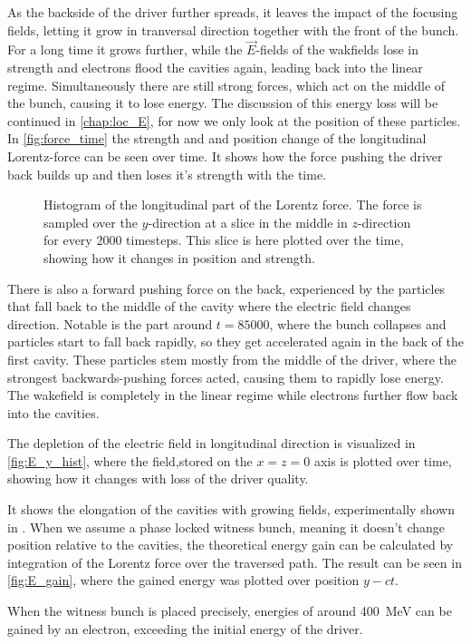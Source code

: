 \documentclass[bachelor_thesis]{subfiles}
\begin{document}
As the backside of the driver further spreads, it leaves the impact of the focusing fields, letting it grow in tranversal direction together with the front of the bunch. For a long time it grows further, while the $\vec{E}$-fields of the wakfields lose in strength and electrons flood the cavities again, leading back into the linear regime.
Simultaneously there are still strong forces, which act on the middle of the bunch, causing it to lose energy. The discussion of this energy loss will be continued in \autoref{chap:loc_E}, for now we only look at the position of these particles.
In \autoref{fig:force_time} the strength and and position change of the longitudinal Lorentz-force can be seen over time. It shows how the force pushing the driver back builds up and then loses it's strength with the time.
\begin{figure}
	\centering
	\missingfigure{}
	\caption{Histogram of the longitudinal part of the Lorentz force. The force is sampled over the $y$-direction at a slice in the middle in $z$-direction for every 2000 timesteps. This slice is here plotted over the time, showing how it changes in position and strength.}
	\label{fig:force_time}
\end{figure}
There is also a forward pushing force on the back, experienced by the particles that fall back to the middle of the cavity where the electric field changes direction. Notable is the part around $t=85000$, where the bunch collapses and particles start to fall back rapidly,
so they get accelerated again in the back of the first cavity. These particles stem mostly from the middle of the driver, where the strongest backwards-pushing forces acted, causing them to rapidly lose energy.
The wakefield is completely in the linear regime while electrons further flow back into the cavities.

The depletion of the electric field in longitudinal direction is visualized in \autoref{fig:E_y_hist}, where the field,stored on the $x=z=0$ axis is plotted over time, showing how it changes with loss of the driver quality.
\begin{figure}
	\centering
	\missingfigure{}
	\caption{}
	\label{fig:E_y_hist}
\end{figure}
It shows the elongation of the cavities with growing fields, experimentally shown in \cite{Schoebel2022}. When we assume a phase locked witness bunch, meaning it doesn't change position relative to the cavities, the theoretical energy gain can be calculated 
by integration of the Lorentz force over the traversed path. The result can be seen in \autoref{fig:E_gain}, where the gained energy was plotted over position $y-ct$.
\begin{figure}
	\centering
	\caption{}
	\label{fig:E_gain}
\end{figure}
When the witness bunch is placed precisely, energies of around \qty{400}{\MeV} can be gained by an electron, exceeding the initial energy of the driver.
\end{document}
